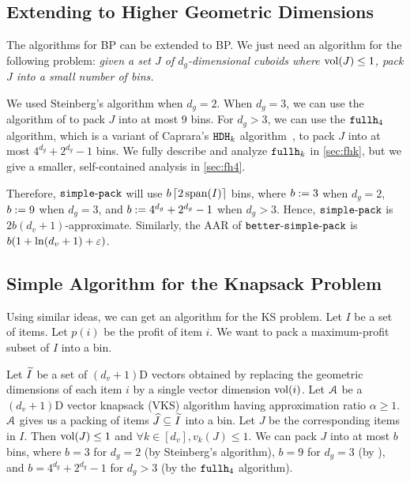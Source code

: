 \subsection{Extending to Higher Geometric Dimensions}

The algorithms for  BP can be extended to  BP.
We just need an algorithm for the following problem:
\textsl{given a set $J$ of $d_g$-dimensional cuboids where $\vol(J) \le 1$,
pack $J$ into a small number of bins.}

We used Steinberg's algorithm when $d_g = 2$.
When $d_g = 3$, we can use the algorithm of \cite[Section 2]{diedrich2008approximation}
to pack $J$ into at most 9 bins.
For $d_g > 3$, we can use the $\fhk[4]$ algorithm, which is a variant of
Caprara's $\hdhk$ algorithm~\cite{caprara2008},
to pack $J$ into at most $4^{d_g} + 2^{d_g} - 1$ bins.
We fully describe and analyze $\fhk$ in \cref{sec:fhk},
but we give a smaller, self-contained analysis in \cref{sec:fh4}.

Therefore, $\simplePack$ will use
$b\ceil{2\Span(I)}$ bins, where $b \defeq 3$ when $d_g=2$,
$b \defeq 9$ when $d_g=3$, and $b \defeq 4^{d_g}+2^{d_g}-1$ when $d_g > 3$.
Hence, $\simplePack$ is $2b(d_v+1)$-approximate.
Similarly, the AAR of $\betterSimplePack$ is $b(1 + \ln(d_v + 1) + \eps)$.

\subsection{Simple Algorithm for the Knapsack Problem}
\label{sec:simple-gvks}

Using similar ideas, we can get an algorithm for the  KS problem.
Let $I$ be a set of  items. Let $p(i)$ be the profit of item $i$.
We want to pack a maximum-profit subset of $I$ into a bin.

Let $\Itild$ be a set of $(d_v+1)$D vectors obtained by replacing the
geometric dimensions of each item $i$ by a single vector dimension $\vol(i)$.
Let $\Acal$ be a $(d_v+1)$D vector knapsack (VKS) algorithm
having approximation ratio $\alpha \ge 1$.
$\Acal$ gives us a packing of items $\Jhat \subseteq \Itild$ into a bin.
Let $J$ be the corresponding items in $I$.
Then $\vol(J) \le 1$ and $\forall k \in [d_v], v_k(J) \le 1$.
We can pack $J$ into at most $b$ bins, where $b=3$ for $d_g=2$ (by Steinberg's algorithm),
$b=9$ for $d_g=3$ (by \cite{diedrich2008approximation}),
and $b = 4^{d_g} + 2^{d_g} - 1$ for $d_g > 3$ (by the $\fhk[4]$ algorithm).


